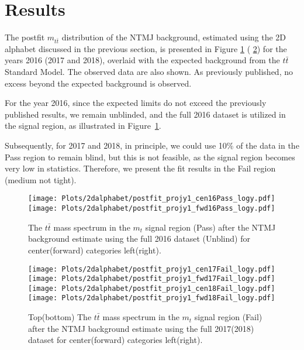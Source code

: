 

\section{Results}
\label{sec:results}



The postfit $m_{t\bar{t}}$ distribution of the NTMJ background, estimated using the 2D alphabet discussed in the previous section, is presented in Figure \ref{fig:mttbar_spectrum_2016} ( \ref{fig:mttbar_spectrum_20172018}) for the years 2016 (2017 and 2018), overlaid with the expected background from the $t\bar{t}$ Standard Model. The observed data are also shown. As previously published, no excess beyond the expected background is observed.

For the year 2016, since the expected limits do not exceed the previously published results, we remain unblinded, and the full 2016 dataset is utilized in the signal region, as illustrated in Figure~\ref{fig:mttbar_spectrum_2016}.

Subsequently, for 2017 and 2018, in principle, we could use 10\% of the data in the Pass region to remain blind, but this is not feasible, as the signal region becomes very low in statistics. Therefore, we present the fit results in the Fail region (medium not tight).


\begin{figure}[h!]
	
	\begin{center}
	     \texttt{[image: Plots/2dalphabet/postfit\_projy1\_cen16Pass\_logy.pdf]} 
	     \texttt{[image: Plots/2dalphabet/postfit\_projy1\_fwd16Pass\_logy.pdf]} 
		\caption{The  $t\bar{t}$ mass spectrum in the $m_{t}$ signal region (Pass) after the NTMJ background estimate using the full 2016 dataset (Unblind) for center(forward) categories left(right). }
		\label{fig:mttbar_spectrum_2016}
	\end{center}
\end{figure}

\begin{figure}[h!]
	
	\begin{center}
		\texttt{[image: Plots/2dalphabet/postfit\_projy1\_cen17Fail\_logy.pdf]} 
		\texttt{[image: Plots/2dalphabet/postfit\_projy1\_fwd17Fail\_logy.pdf]} \\
		
		\texttt{[image: Plots/2dalphabet/postfit\_projy1\_cen18Fail\_logy.pdf]} 
		\texttt{[image: Plots/2dalphabet/postfit\_projy1\_fwd18Fail\_logy.pdf]} \\
		
		\caption{Top(bottom) The  $t\bar{t}$ mass spectrum in the $m_{t}$ signal region (Fail)  after the NTMJ background estimate using the full 2017(2018) dataset for center(forward) categories left(right). }
		\label{fig:mttbar_spectrum_20172018}
	\end{center}
\end{figure}



